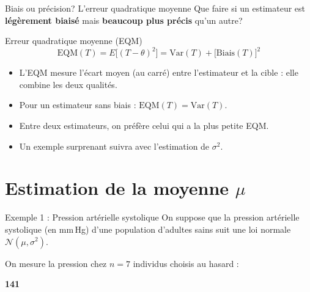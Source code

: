 \documentclass{BeamerTemplate}
\begin{document}
\begin{frame}[t]{Biais ou précision? L'erreur quadratique moyenne}
  Que faire si un estimateur est \textbf{légèrement biaisé} mais \textbf{beaucoup plus précis} qu'un autre?

  \medskip
  \begin{Boite}{Erreur quadratique moyenne (EQM)}
    $$\text{EQM}(T) = E\big[(T - \theta)^2\big] = \text{Var}(T) + \big[\text{Biais}(T)\big]^2$$
  \end{Boite}

  \medskip
  \begin{itemize}\itemsep 2mm
    \item<2-> L'EQM mesure l'écart moyen (au carré) entre l'estimateur et la cible : elle \alert{combine les deux qualités}.
    \item<2-> Pour un estimateur sans biais : $\text{EQM}(T) = \text{Var}(T)$.
    \item<2-> Entre deux estimateurs, on préfère celui qui a la \alert{plus petite EQM}.
    \item<2-> Un exemple surprenant suivra avec l'estimation de $\sigma^2$.
  \end{itemize}
\end{frame}

\section{Estimation de la moyenne \texorpdfstring{$\mu$}{mu}}

\begin{frame}[t]{Exemple 1 : Pression artérielle systolique}
  On suppose que la pression artérielle systolique (en mm\,Hg) d'une population d'adultes sains suit une loi normale $\mathcal{N}(\mu, \sigma^2)$.

  \medskip
  On mesure la pression chez $n = 7$ individus choisis au hasard :
  \begin{center}
    \textbf{141      }
  \end{center}

  \medskip

  \medskip
\end{frame}
\end{document}
